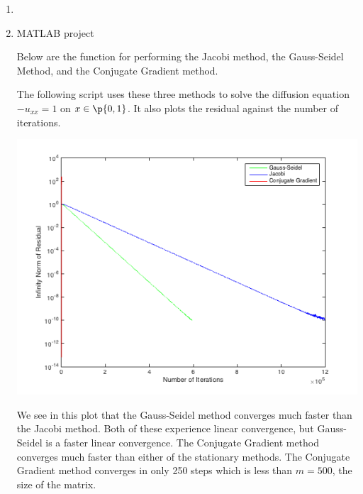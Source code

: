 \documentclass[11pt]{article}
\begin{document}
\begin{enumerate}
    \item %
        

    \item %
        MATLAB project

        Below are the function for performing the 
        Jacobi method, the Gauss-Seidel Method, and the Conjugate Gradient
        method.
        
        
        

        The following script uses these three methods to solve the diffusion
        equation $-u_{xx} = 1$ on $x \in \p{0, 1}$.
        It also plots the residual against the number of iterations.
        
        \begin{center}
            \includegraphics[scale=.7]{Figures/05_10_1.png}
        \end{center}

        We see in this plot that the Gauss-Seidel method converges much faster
        than the Jacobi method.
        Both of these experience linear convergence, but Gauss-Seidel is a faster
        linear convergence.
        The Conjugate Gradient method converges much faster than either of the
        stationary methods.
        The Conjugate Gradient method converges in only 250 steps which is less
        than $m = 500$, the size of the matrix.
\end{enumerate}
\end{document}
